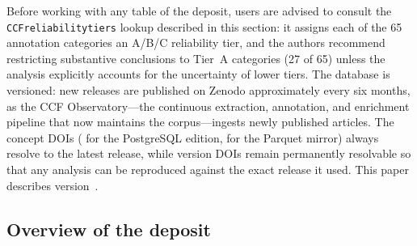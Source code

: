 \documentclass[12pt]{article}
\renewcommand\_{\texttt{\detokenize{_}\allowbreak}}
\begin{document}
Before working with any table of the deposit, users are advised to consult the \texttt{CCF\_reliability\_tiers} lookup described in this section: it assigns each of the 65 annotation categories an A/B/C reliability tier, and the authors recommend restricting substantive conclusions to Tier~A categories (27 of 65) unless the analysis explicitly accounts for the uncertainty of lower tiers. The database is versioned: new releases are published on Zenodo approximately every six months, as the CCF Observatory---the continuous extraction, annotation, and enrichment pipeline that now maintains the corpus---ingests newly published articles. The concept DOIs (\CCFsqldoiConcept{} for the PostgreSQL edition, \CCFparquetdoiConcept{} for the Parquet mirror) always resolve to the latest release, while version DOIs remain permanently resolvable so that any analysis can be reproduced against the exact release it used. This paper describes version~\CCFversion{}.

\subsection{Overview of the deposit}
\end{document}
